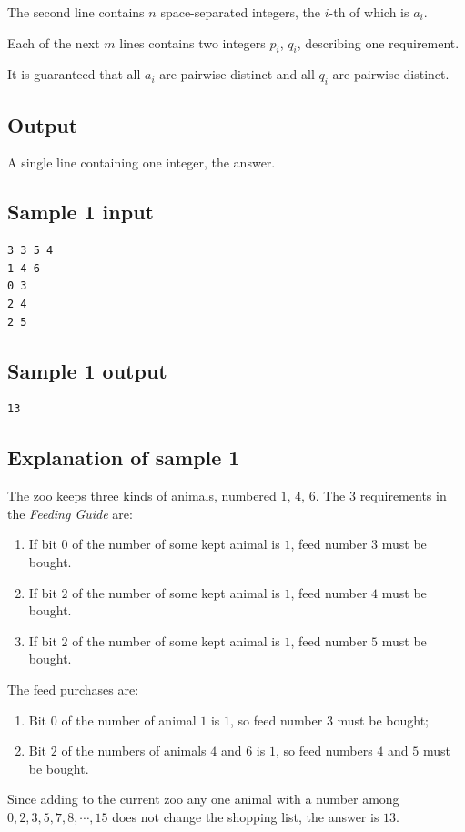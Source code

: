 \documentclass[11pt]{article}
\begin{document}
The second line contains $n$ space-separated integers, the $i$-th of which
is $a_i$.

Each of the next $m$ lines contains two integers $p_i$, $q_i$, describing one
requirement.

It is guaranteed that all $a_i$ are pairwise distinct and all $q_i$ are
pairwise distinct.

\subsection*{Output}

A single line containing one integer, the answer.

\subsection*{Sample 1 input}

\begin{verbatim}
3 3 5 4
1 4 6
0 3
2 4
2 5
\end{verbatim}

\subsection*{Sample 1 output}

\begin{verbatim}
13
\end{verbatim}

\subsection*{Explanation of sample 1}

The zoo keeps three kinds of animals, numbered $1$, $4$, $6$.
The $3$ requirements in the \emph{Feeding Guide} are:
\begin{enumerate}
\item If bit $0$ of the number of some kept animal is $1$, feed number $3$
  must be bought.
\item If bit $2$ of the number of some kept animal is $1$, feed number $4$
  must be bought.
\item If bit $2$ of the number of some kept animal is $1$, feed number $5$
  must be bought.
\end{enumerate}
The feed purchases are:
\begin{enumerate}
\item Bit $0$ of the number of animal $1$ is $1$, so feed number $3$ must be
  bought;
\item Bit $2$ of the numbers of animals $4$ and $6$ is $1$, so feed numbers
  $4$ and $5$ must be bought.
\end{enumerate}
Since adding to the current zoo any one animal with a number among
$0, 2, 3, 5, 7, 8, \cdots, 15$ does not change the shopping list,
the answer is $13$.
\end{document}
